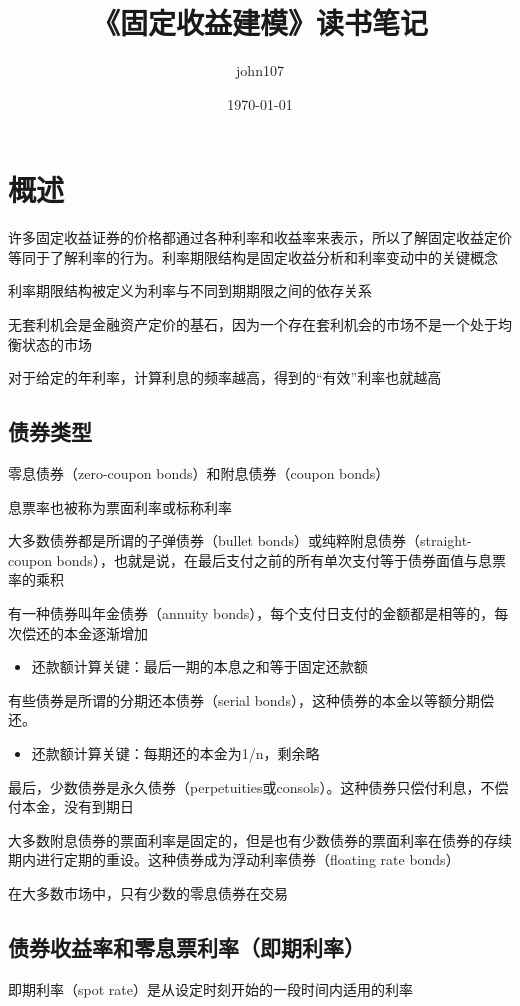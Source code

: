 \documentclass[UTF8]{ctexart}
\title{《固定收益建模》读书笔记}
\author{john107}
\date{\today}
\begin{document}
\maketitle
\clearpage
\tableofcontents
\clearpage
\section{概述}
许多固定收益证券的价格都通过各种利率和收益率来表示，所以了解固定收益定价等同于了解利率的行为。利率期限结构是固定收益分析和利率变动中的关键概念

利率期限结构被定义为利率与不同到期期限之间的依存关系

无套利机会是金融资产定价的基石，因为一个存在套利机会的市场不是一个处于均衡状态的市场

对于给定的年利率，计算利息的频率越高，得到的“有效”利率也就越高

\subsection{债券类型}
零息债券（zero-coupon bonds）和附息债券（coupon bonds）

息票率也被称为票面利率或标称利率

大多数债券都是所谓的子弹债券（bullet bonds）或纯粹附息债券（straight-coupon bonds），也就是说，在最后支付之前的所有单次支付等于债券面值与息票率的乘积

有一种债券叫年金债券（annuity bonds），每个支付日支付的金额都是相等的，每次偿还的本金逐渐增加

\begin{itemize}
\item{还款额计算关键：最后一期的本息之和等于固定还款额}
\end{itemize}

有些债券是所谓的分期还本债券（serial bonds），这种债券的本金以等额分期偿还。

\begin{itemize}
\item{还款额计算关键：每期还的本金为1/n，剩余略}
\end{itemize}

最后，少数债券是永久债券（perpetuities或consols）。这种债券只偿付利息，不偿付本金，没有到期日

大多数附息债券的票面利率是固定的，但是也有少数债券的票面利率在债券的存续期内进行定期的重设。这种债券成为浮动利率债券（floating rate bonds）

在大多数市场中，只有少数的零息债券在交易

\subsection{债券收益率和零息票利率（即期利率）}
即期利率（spot rate）是从设定时刻开始的一段时间内适用的利率
\end{document}
